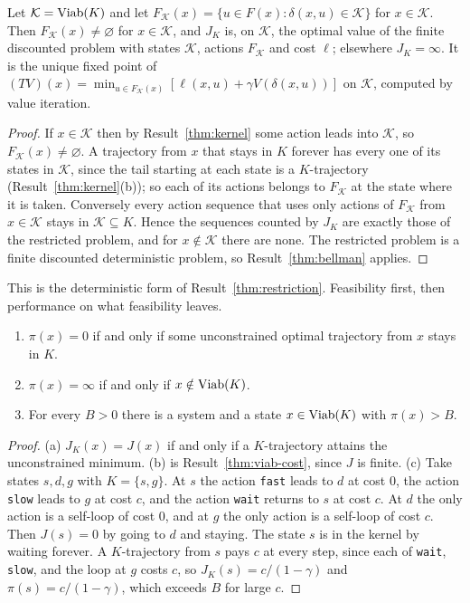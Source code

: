 \begin{newresult}\label{thm:viab-cost}
Let $\mathcal K=\operatorname{Viab}(K)$ and let $F_{\mathcal K}(x)=\{u\in F(x):\delta(x,u)\in\mathcal K\}$ for $x\in\mathcal K$. Then $F_{\mathcal K}(x)\ne\varnothing$ for $x\in\mathcal K$, and $J_K$ is, on $\mathcal K$, the optimal value of the finite discounted problem with states $\mathcal K$, actions $F_{\mathcal K}$ and cost $\ell$; elsewhere $J_K=\infty$. It is the unique fixed point of $(TV)(x)=\min_{u\in F_{\mathcal K}(x)}[\ell(x,u)+\gamma V(\delta(x,u))]$ on $\mathcal K$, computed by value iteration.
\end{newresult}
\begin{proof}
If $x\in\mathcal K$ then by Result~\ref{thm:kernel} some action leads into $\mathcal K$, so $F_{\mathcal K}(x)\ne\varnothing$. A trajectory from $x$ that stays in $K$ forever has every one of its states in $\mathcal K$, since the tail starting at each state is a $K$-trajectory (Result~\ref{thm:kernel}(b)); so each of its actions belongs to $F_{\mathcal K}$ at the state where it is taken. Conversely every action sequence that uses only actions of $F_{\mathcal K}$ from $x\in\mathcal K$ stays in $\mathcal K\subseteq K$. Hence the sequences counted by $J_K$ are exactly those of the restricted problem, and for $x\notin\mathcal K$ there are none. The restricted problem is a finite discounted deterministic problem, so Result~\ref{thm:bellman} applies.
\end{proof}

This is the deterministic form of Result~\ref{thm:restriction}. Feasibility first, then performance on what feasibility leaves.

\begin{newresult}\label{prop:price}
\begin{enumerate}[nosep,label=(\alph*)]
  \item $\pi(x)=0$ if and only if some unconstrained optimal trajectory from $x$ stays in $K$.
  \item $\pi(x)=\infty$ if and only if $x\notin\operatorname{Viab}(K)$.
  \item For every $B>0$ there is a system and a state $x\in\operatorname{Viab}(K)$ with $\pi(x)>B$.
\end{enumerate}
\end{newresult}
\begin{proof}
(a) $J_K(x)=J(x)$ if and only if a $K$-trajectory attains the unconstrained minimum. (b) is Result~\ref{thm:viab-cost}, since $J$ is finite. (c) Take states $s,d,g$ with $K=\{s,g\}$. At $s$ the action \texttt{fast} leads to $d$ at cost $0$, the action \texttt{slow} leads to $g$ at cost $c$, and the action \texttt{wait} returns to $s$ at cost $c$. At $d$ the only action is a self-loop of cost $0$, and at $g$ the only action is a self-loop of cost $c$. Then $J(s)=0$ by going to $d$ and staying. The state $s$ is in the kernel by waiting forever. A $K$-trajectory from $s$ pays $c$ at every step, since each of \texttt{wait}, \texttt{slow}, and the loop at $g$ costs $c$, so $J_K(s)=c/(1-\gamma)$ and $\pi(s)=c/(1-\gamma)$, which exceeds $B$ for large $c$.
\end{proof}

